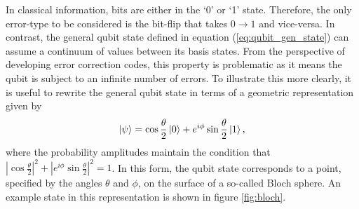 \documentclass[]{arxiv}
\theoremstyle{plain}%
\theoremstyle{definition}
\theoremstyle{remark}
\begin{document}
In classical information, bits are either in the `0' or `1' state. Therefore, the only error-type to be considered is the bit-flip that takes $0\rightarrow1$ and vice-versa. In contrast, the general qubit state defined in equation (\ref{eq:qubit_gen_state}) can assume a continuum of values between its basis states. From the perspective of developing error correction codes, this property is problematic as it means the qubit is subject to an infinite number of errors. To illustrate this more clearly, it is useful to rewrite the general qubit state in terms of a geometric representation given by
%
\begin{equation}
\ket{\psi}=\cos{\frac{\theta}{2}}\ket{0}+e^{i\phi}\sin{\frac{\theta}{2}}\ket{1}\rm,
\end{equation}
%
where the probability amplitudes maintain the condition that $|\cos{\frac{\theta}{2}}|^2+| e^{i\phi}\sin{\frac{\theta}{2}}|^2=1$. In this form, the qubit state corresponds to a point, specified by the angles $\theta$ and $\phi$, on the surface of a so-called Bloch sphere. An example state in this representation is shown in figure \ref{fig:bloch}.
\end{document}
